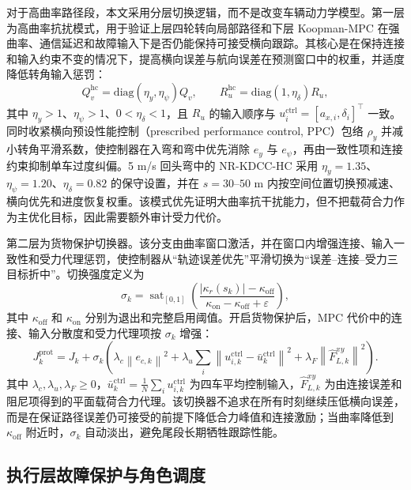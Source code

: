 \documentclass[twocolumn,3p,times,procedia]{elsarticle}
\newcommand{\MethodHC}{NR-KDCC-HC}
\newcommand{\norm}[1]{\left\lVert #1 \right\rVert}
\begin{document}
对于高曲率路径段，本文采用分层切换逻辑，而不是改变车辆动力学模型。第一层为高曲率抗扰模式，用于验证上层四轮转向局部路径和下层 Koopman-MPC 在强曲率、通信延迟和故障输入下是否仍能保持可接受横向跟踪。其核心是在保持连接和输入约束不变的情况下，提高横向误差与航向误差在预测窗口中的权重，并适度降低转角输入惩罚：
\begin{equation}
Q_v^{\mathrm{hc}}=\mathrm{diag}(\eta_y,\eta_\psi)Q_v,\qquad
R_u^{\mathrm{hc}}=\mathrm{diag}(1,\eta_\delta)R_u ,
\label{eq:high_curvature_lateral_priority}
\end{equation}
其中 $\eta_y>1$、$\eta_\psi>1$、$0<\eta_\delta<1$，且 $R_u$ 的输入顺序与 $u_i^{\mathrm{ctrl}}=[a_{x,i},\delta_i]^\top$ 一致。同时收紧横向预设性能控制（prescribed performance control, PPC）包络 $\rho_y$ 并减小转角平滑系数，使控制器在入弯和弯中优先消除 $e_y$ 与 $e_\psi$，再由一致性项和连接约束抑制单车过度纠偏。5 m/s 回头弯中的 \MethodHC{} 采用 $\eta_y=1.35$、$\eta_\psi=1.20$、$\eta_\delta=0.82$ 的保守设置，并在 $s=30$--$50$ m 内按空间位置切换预减速、横向优先和进度恢复权重。该模式优先证明大曲率抗干扰能力，但不把载荷合力作为主优化目标，因此需要额外审计受力代价。

第二层为货物保护切换器。该分支由曲率窗口激活，并在窗口内增强连接、输入一致性和受力代理惩罚，使控制器从“轨迹误差优先”平滑切换为“误差--连接--受力三目标折中”。切换强度定义为
\begin{equation}
\sigma_k=\operatorname{sat}_{[0,1]}\!\left(
\frac{|\kappa_r(s_k)|-\kappa_{\mathrm{off}}}
{\kappa_{\mathrm{on}}-\kappa_{\mathrm{off}}+\varepsilon}
\right),
\label{eq:payload_protection_switch}
\end{equation}
其中 $\kappa_{\mathrm{off}}$ 和 $\kappa_{\mathrm{on}}$ 分别为退出和完整启用阈值。开启货物保护后，MPC 代价中的连接、输入分散度和受力代理项按 $\sigma_k$ 增强：
\begin{equation}
J_k^{\mathrm{prot}}=J_k+
\sigma_k\!\left(
\lambda_c\norm{e_{c,k}}^2+
\lambda_u\sum_i\norm{u_{i,k}^{\mathrm{ctrl}}-\bar u_k^{\mathrm{ctrl}}}^2+
\lambda_F\norm{\hat F_{L,k}^{xy}}^2
\right).
\label{eq:payload_protection_cost}
\end{equation}
其中 $\lambda_c,\lambda_u,\lambda_F\ge0$，$\bar u_k^{\mathrm{ctrl}}=\frac{1}{N}\sum_i u_{i,k}^{\mathrm{ctrl}}$ 为四车平均控制输入，$\hat F_{L,k}^{xy}$ 为由连接误差和阻尼项得到的平面载荷合力代理。该切换器不追求在所有时刻继续压低横向误差，而是在保证路径误差仍可接受的前提下降低合力峰值和连接激励；当曲率降低到 $\kappa_{\mathrm{off}}$ 附近时，$\sigma_k$ 自动淡出，避免尾段长期牺牲跟踪性能。

\subsection{执行层故障保护与角色调度}
\end{document}
